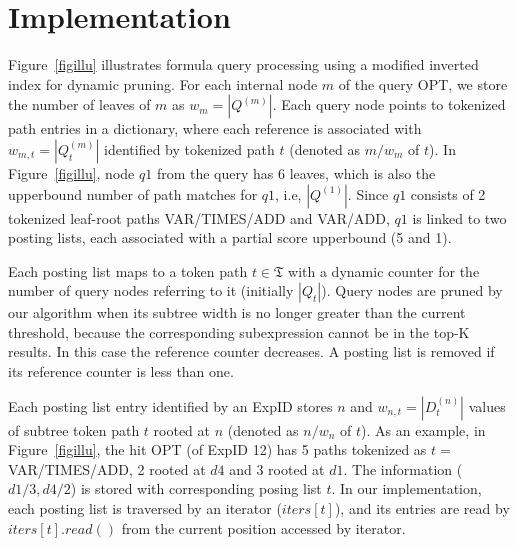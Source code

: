 \documentclass[runningheads]{llncs}
\begin{document}
%

\section{Implementation}

Figure~\ref{figillu} illustrates formula query processing using a modified inverted index for dynamic pruning.
For each internal node $m$ of the query OPT, we store the number of leaves of $m$  as $w_m = |Q^{(m)}|$. 
Each query node points to tokenized path entries in a dictionary,
where each reference is associated with $w_{m,t} = |Q^{(m)}_t|$ identified by tokenized path $t$ (denoted as $m/w_m$ of $t$).
%
In Figure~\ref{figillu}, node $q1$ from the query has 6 leaves, which is also the upperbound number of path matches for $q1$, i.e, $|Q^{(1)}|$.
Since $q1$ consists of 2 tokenized leaf-root paths VAR/TIMES/ADD and VAR/ADD,
$q1$ is linked to two posting lists, each associated with a partial score upperbound (5 and 1).

Each posting list maps to a token path $t \in \mathfrak{T}$ with a dynamic counter for the number of query nodes referring to it (initially $|Q_t|$).
Query nodes are pruned by our algorithm when its subtree width is no longer greater than the current threshold, because the corresponding subexpression cannot be in the top-K results. In this case
the reference counter decreases. A posting list is removed if its reference counter is less than one.

Each posting list entry identified by an ExpID stores $n$ and $w_{n,t} = |D^{(n)}_t|$ values of subtree token path $t$ rooted at $n$ (denoted as $n/w_n$ of $t$).
%
As an example, in Figure~\ref{figillu}, the hit OPT (of ExpID 12) has 5 paths tokenized as $t =$ VAR/TIMES/ADD, 2 rooted at $d4$ and 3 rooted at $d1$. The information ($d1/3, d4/2$) is stored with corresponding posing list $t$.
In our implementation, each posting list is traversed by an iterator ($iters[t]$), and its entries are read by $iters[t].read()$ from the current position accessed by iterator.
\end{document}
